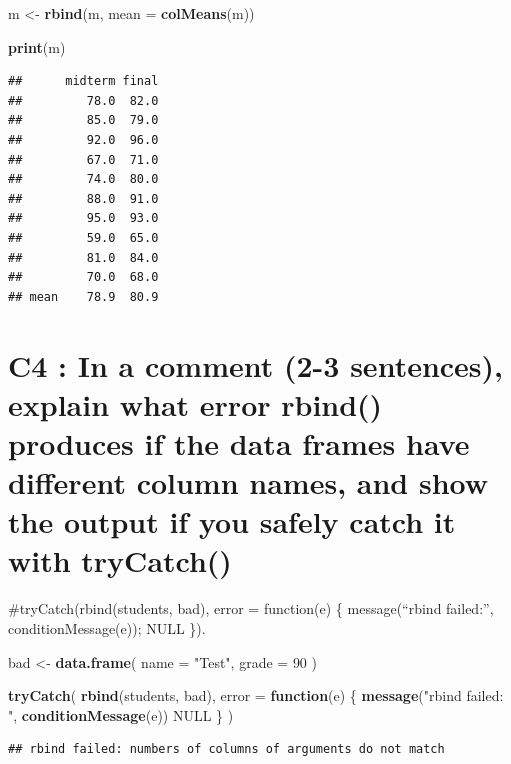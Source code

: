 \documentclass[
]{article}
\newenvironment{Shaded}{\begin{snugshade}}{\end{snugshade}}
\newcommand{\AttributeTok}[1]{\textcolor[rgb]{0.13,0.29,0.53}{#1}}
\newcommand{\ConstantTok}[1]{\textcolor[rgb]{0.56,0.35,0.01}{#1}}
\newcommand{\ControlFlowTok}[1]{\textcolor[rgb]{0.13,0.29,0.53}{\textbf{#1}}}
\newcommand{\DecValTok}[1]{\textcolor[rgb]{0.00,0.00,0.81}{#1}}
\newcommand{\FunctionTok}[1]{\textcolor[rgb]{0.13,0.29,0.53}{\textbf{#1}}}
\newcommand{\NormalTok}[1]{#1}
\newcommand{\OtherTok}[1]{\textcolor[rgb]{0.56,0.35,0.01}{#1}}
\newcommand{\StringTok}[1]{\textcolor[rgb]{0.31,0.60,0.02}{#1}}
\begin{document}
\begin{Shaded}
\begin{Highlighting}[]
\NormalTok{m }\OtherTok{\textless{}{-}} \FunctionTok{rbind}\NormalTok{(m, }\AttributeTok{mean =} \FunctionTok{colMeans}\NormalTok{(m))}

\FunctionTok{print}\NormalTok{(m)}
\end{Highlighting}
\end{Shaded}

\begin{verbatim}
##      midterm final
##         78.0  82.0
##         85.0  79.0
##         92.0  96.0
##         67.0  71.0
##         74.0  80.0
##         88.0  91.0
##         95.0  93.0
##         59.0  65.0
##         81.0  84.0
##         70.0  68.0
## mean    78.9  80.9
\end{verbatim}

\section{C4 : In a comment (2-3 sentences), explain what error rbind()
produces if the data frames have different column names, and show the
output if you safely catch it with
tryCatch()}\label{c4-in-a-comment-2-3-sentences-explain-what-error-rbind-produces-if-the-data-frames-have-different-column-names-and-show-the-output-if-you-safely-catch-it-with-trycatch}

\#tryCatch(rbind(students, bad), error = function(e) \{ message(``rbind
failed:'', conditionMessage(e)); NULL \}).

\begin{Shaded}
\begin{Highlighting}[]
\NormalTok{bad }\OtherTok{\textless{}{-}} \FunctionTok{data.frame}\NormalTok{(}
  \AttributeTok{name =} \StringTok{"Test"}\NormalTok{,}
  \AttributeTok{grade =} \DecValTok{90}
\NormalTok{)}

\FunctionTok{tryCatch}\NormalTok{(}
  \FunctionTok{rbind}\NormalTok{(students, bad),}
  \AttributeTok{error =} \ControlFlowTok{function}\NormalTok{(e) \{}
    \FunctionTok{message}\NormalTok{(}\StringTok{"rbind failed: "}\NormalTok{, }\FunctionTok{conditionMessage}\NormalTok{(e))}
    \ConstantTok{NULL}
\NormalTok{  \}}
\NormalTok{)}
\end{Highlighting}
\end{Shaded}

\begin{verbatim}
## rbind failed: numbers of columns of arguments do not match
\end{verbatim}
\end{document}
